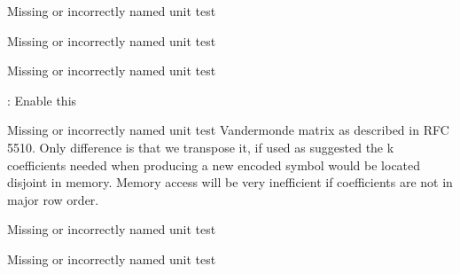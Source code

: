 \begin{DoxyRefList}
\item[\label{todo__todo000047}%
\hypertarget{todo__todo000047}{}%
Class \hyperlink{classkodo_1_1systematic__vandermonde__matrix}{kodo\-:\-:systematic\-\_\-vandermonde\-\_\-matrix$<$ Super\-Coder $>$} ]Missing or incorrectly named unit test  
\item[\label{todo__todo000048}%
\hypertarget{todo__todo000048}{}%
Class \hyperlink{classkodo_1_1systematic__vandermonde__matrix__base}{kodo\-:\-:systematic\-\_\-vandermonde\-\_\-matrix\-\_\-base$<$ Super\-Coder $>$} ]Missing or incorrectly named unit test  
\item[\label{todo__todo000049}%
\hypertarget{todo__todo000049}{}%
Class \hyperlink{classkodo_1_1transpose__vandermonde__matrix}{kodo\-:\-:transpose\-\_\-vandermonde\-\_\-matrix$<$ Super\-Coder $>$} ]Missing or incorrectly named unit test  
\item[\label{todo__todo000068}%
\hypertarget{todo__todo000068}{}%
Member \hyperlink{classkodo_1_1uniform__generator_af46febf68f07fc48c735c499d131e511}{kodo\-:\-:uniform\-\_\-generator$<$ Super\-Coder $>$\-:\-:generate} (uint8\-\_\-t $\ast$coefficients)]\-: Enable this  
\item[\label{todo__todo000050}%
\hypertarget{todo__todo000050}{}%
Class \hyperlink{classkodo_1_1vandermonde__matrix}{kodo\-:\-:vandermonde\-\_\-matrix$<$ Super\-Coder $>$} ]Missing or incorrectly named unit test Vandermonde matrix as described in R\-F\-C 5510. Only difference is that we transpose it, if used as suggested the k coefficients needed when producing a new encoded symbol would be located disjoint in memory. Memory access will be very inefficient if coefficients are not in major row order.  
\item[\label{todo__todo000051}%
\hypertarget{todo__todo000051}{}%
Class \hyperlink{classkodo_1_1vandermonde__matrix__base}{kodo\-:\-:vandermonde\-\_\-matrix\-\_\-base$<$ Super\-Coder $>$} ]Missing or incorrectly named unit test  
\item[\label{todo__todo000069}%
\hypertarget{todo__todo000069}{}%
Class \hyperlink{classkodo_1_1zero__symbol__encoder}{kodo\-:\-:zero\-\_\-symbol\-\_\-encoder$<$ Super\-Coder $>$} ]Missing or incorrectly named unit test


\end{DoxyRefList}